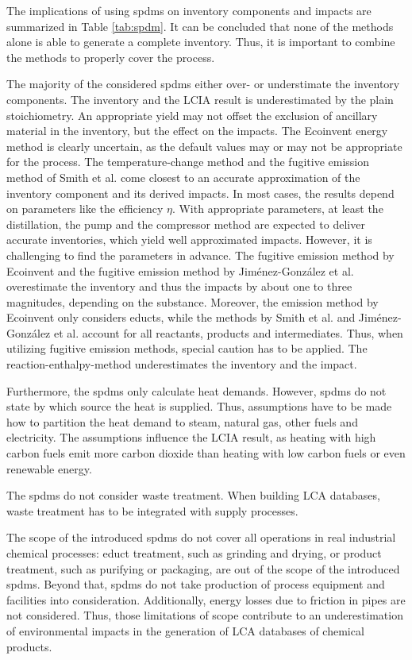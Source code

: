 The implications of using \aclp{spdm} on inventory components and impacts are summarized in Table \ref{tab:spdm}. It can be concluded that none of the methods alone is able to generate a complete inventory. Thus, it is important to combine the methods to properly cover the process.

The majority of the considered \aclp{spdm}  either over- or understimate the inventory components. The inventory and the LCIA result is underestimated by the plain stoichiometry. An appropriate yield may not offset the exclusion of ancillary material in the inventory, but the effect on the impacts. The Ecoinvent energy method is clearly uncertain, as the default values may or may not be appropriate for the process. The temperature-change method and the fugitive emission method of Smith et al. come closest to an accurate approximation of the inventory component and its derived impacts. In most cases, the results depend on parameters like the efficiency $\eta$. With appropriate parameters, at least the distillation, the pump and the compressor method are expected to deliver accurate inventories,  which yield well approximated impacts. However, it is challenging to find the parameters in advance. The fugitive emission method by Ecoinvent and the fugitive emission method by Jiménez-González et al. overestimate the inventory and thus the impacts by about one to three magnitudes, depending on the substance. Moreover, the emission method by Ecoinvent only considers educts, while the methods by Smith et al. and Jiménez-González et al. account for all reactants,  products and  intermediates. Thus, when utilizing fugitive emission methods, special caution has to be applied. The reaction-enthalpy-method underestimates the inventory and the impact. 

Furthermore, the \aclp{spdm} only calculate heat demands. However, \aclp{spdm} do not state by which source the heat is supplied. Thus, assumptions have to be made how to partition the heat demand to steam, natural gas, other fuels and electricity. The assumptions influence the LCIA result, as heating with high carbon fuels emit more carbon dioxide than heating with low carbon fuels or even renewable energy. 

The \aclp{spdm} do not consider waste treatment. When building LCA databases, waste treatment has to be integrated with supply processes.%

The scope of the introduced \aclp{spdm} do not cover all operations in real industrial chemical processes: educt treatment, such as grinding and drying, or product treatment, such as purifying or packaging, are out of the scope of the introduced \aclp{spdm}. Beyond that, \aclp{spdm} do not take production of process equipment and facilities into consideration. Additionally, energy losses due to friction in pipes are not considered. Thus, those limitations of scope contribute to an underestimation of environmental impacts in the generation of LCA databases of chemical products.


